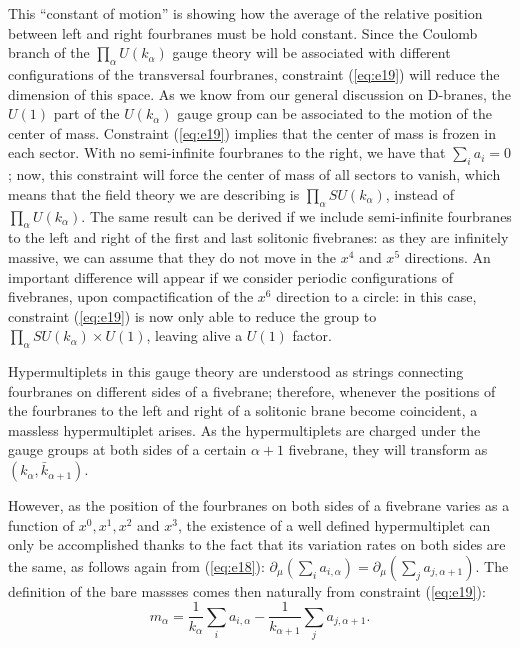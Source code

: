This ``constant of motion'' is showing how the average of the
relative position between left and right fourbranes must be hold
constant. Since the Coulomb branch of the $\prod_{\alpha}
U(k_{\alpha}) $ gauge theory will be associated with different
configurations of the transversal fourbranes, constraint
(\ref{eq:e19}) will reduce the dimension of this space. As we
know from our general discussion on D-branes, the $U(1)$ part of
the $U(k_{\alpha})$ gauge group can be associated to the motion
of the center of mass. Constraint (\ref{eq:e19}) implies that the
center of mass is frozen in each sector. With no semi-infinite
fourbranes to the right, we have that $\sum_i a_i=0$; now, this
constraint will force the center of mass of all sectors to
vanish, which means that the field theory we are describing is
$\prod_{\alpha} SU(k_{\alpha})$, instead of $\prod_{\alpha}
U(k_{\alpha})$. The same result can be derived if we include
semi-infinite fourbranes to the left and right of the first and 
last solitonic fivebranes: as they are infinitely massive, we can
assume that they do not move in the $x^4$ and $x^5$ directions.
An important difference will appear if we consider periodic
configurations of fivebranes, upon compactification of the $x^6$
direction to a circle: in this case, constraint (\ref{eq:e19}) is
now only able to reduce the group to $\prod_{\alpha}
SU(k_{\alpha}) \times U(1)$, leaving alive a $U(1)$ factor.
  
Hypermultiplets in this gauge theory are understood as strings
connecting fourbranes on different sides of a fivebrane;
therefore, whenever the positions of the fourbranes to the left and
right of a solitonic brane become coincident, a massless
hypermultiplet arises. As the hypermultiplets are charged under
the gauge groups at both sides of a certain $\alpha+1$ fivebrane,
they will transform as $(k_{\alpha},\bar{k}_{\alpha+1})$.
  
However, as the position of the fourbranes on both sides of a
fivebrane varies as a function of $x^0, x^1,x^2$ and $x^3$, the
existence of a well defined hypermultiplet can only be
accomplished thanks to the fact that its variation rates on
both sides are the same, as follows again from (\ref{eq:e18}):
$\partial_{\mu}(\sum_i a_{i,\alpha}) = \partial_{\mu}(\sum_j
a_{j,\alpha+1})$. The definition of the bare massses comes then
naturally from constraint (\ref{eq:e19}):
\begin{equation}
m_{\alpha} = \frac {1}{k_{\alpha}} \sum_i a_{i,\alpha} - \frac
{1}{k_{\alpha+1}} \sum_j a_{j,\alpha+1}.
\label{eq:e20}
\end{equation}
  
